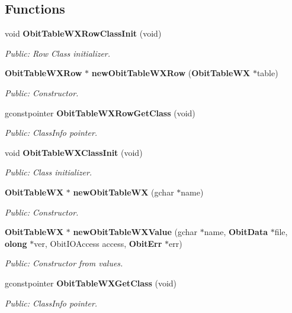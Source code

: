 \subsection*{Functions}
\begin{CompactItemize}
\item 
void {\bf Obit\-Table\-WXRow\-Class\-Init} (void)
\begin{CompactList}\small\item\em Public: Row Class initializer. \item\end{CompactList}\item 
{\bf Obit\-Table\-WXRow} $\ast$ {\bf new\-Obit\-Table\-WXRow} ({\bf Obit\-Table\-WX} $\ast$table)
\begin{CompactList}\small\item\em Public: Constructor. \item\end{CompactList}\item 
gconstpointer {\bf Obit\-Table\-WXRow\-Get\-Class} (void)
\begin{CompactList}\small\item\em Public: Class\-Info pointer. \item\end{CompactList}\item 
void {\bf Obit\-Table\-WXClass\-Init} (void)
\begin{CompactList}\small\item\em Public: Class initializer. \item\end{CompactList}\item 
{\bf Obit\-Table\-WX} $\ast$ {\bf new\-Obit\-Table\-WX} (gchar $\ast$name)
\begin{CompactList}\small\item\em Public: Constructor. \item\end{CompactList}\item 
{\bf Obit\-Table\-WX} $\ast$ {\bf new\-Obit\-Table\-WXValue} (gchar $\ast$name, {\bf Obit\-Data} $\ast$file, {\bf olong} $\ast$ver, Obit\-IOAccess access, {\bf Obit\-Err} $\ast$err)
\begin{CompactList}\small\item\em Public: Constructor from values. \item\end{CompactList}\item 
gconstpointer {\bf Obit\-Table\-WXGet\-Class} (void)
\begin{CompactList}\small\item\em Public: Class\-Info pointer. \item\end{CompactList}\item 

\end{CompactItemize}
